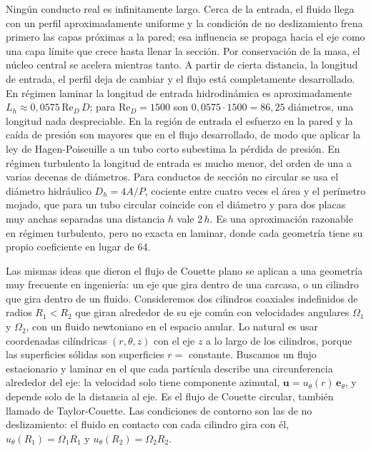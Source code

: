 \documentclass[10pt,openany]{book}
\begin{document}
Ningún conducto real es infinitamente largo. Cerca de la entrada, el fluido llega con un perfil aproximadamente uniforme y la condición de no deslizamiento frena primero las capas próximas a la pared; esa influencia se propaga hacia el eje como una capa límite que crece hasta llenar la sección. Por conservación de la masa, el núcleo central se acelera mientras tanto. A partir de cierta distancia, la longitud de entrada, el perfil deja de cambiar y el flujo está completamente desarrollado. En régimen laminar la longitud de entrada hidrodinámica es aproximadamente \(L_h \approx 0{,}0575\,\mathrm{Re}_D\,D\); para \(\mathrm{Re}_D = 1500\) son \(0{,}0575\cdot 1500 = 86{,}25\) diámetros, una longitud nada despreciable. En la región de entrada el esfuerzo en la pared y la caída de presión son mayores que en el flujo desarrollado, de modo que aplicar la ley de Hagen-Poiseuille a un tubo corto subestima la pérdida de presión. En régimen turbulento la longitud de entrada es mucho menor, del orden de una a varias decenas de diámetros. Para conductos de sección no circular se usa el diámetro hidráulico \(D_h = 4A/P\), cociente entre cuatro veces el área y el perímetro mojado, que para un tubo circular coincide con el diámetro y para dos placas muy anchas separadas una distancia \(h\) vale \(2\,h\). Es una aproximación razonable en régimen turbulento, pero no exacta en laminar, donde cada geometría tiene su propio coeficiente en lugar de 64.

Las mismas ideas que dieron el flujo de Couette plano se aplican a una geometría muy frecuente en ingeniería: un eje que gira dentro de una carcasa, o un cilindro que gira dentro de un fluido. Consideremos dos cilindros coaxiales indefinidos de radios \(R_1 < R_2\) que giran alrededor de su eje común con velocidades angulares \(\Omega_1\) y \(\Omega_2\), con un fluido newtoniano en el espacio anular. Lo natural es usar coordenadas cilíndricas \((r, \theta, z)\) con el eje \(z\) a lo largo de los cilindros, porque las superficies sólidas son superficies \(r = \) constante. Buscamos un flujo estacionario y laminar en el que cada partícula describe una circunferencia alrededor del eje: la velocidad solo tiene componente azimutal, \(\mathbf{u} = u_\theta(r)\,\mathbf{e}_\theta\), y depende solo de la distancia al eje. Es el flujo de Couette circular, también llamado de Taylor-Couette. Las condiciones de contorno son las de no deslizamiento: el fluido en contacto con cada cilindro gira con él, \(u_\theta(R_1) = \Omega_1 R_1\) y \(u_\theta(R_2) = \Omega_2 R_2\).
\end{document}
